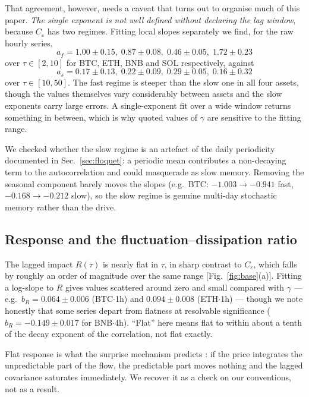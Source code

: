 \documentclass[aps,pre,twocolumn,superscriptaddress,floatfix,nofootinbib]{revtex4-2}
\newcommand{\eps}{\varepsilon}
\begin{document}
That agreement, however, needs a caveat that turns out to organise much of this
paper. \emph{The single exponent is not well defined without declaring the lag
window}, because $C_\eps$ has two regimes. Fitting local slopes separately we
find, for the raw hourly series,
\begin{equation}
  a_f = 1.00\pm0.15,\; 0.87\pm0.08,\; 0.46\pm0.05,\; 1.72\pm0.23
\end{equation}
over $\tau\in[2,10]$ for BTC, ETH, BNB and SOL respectively, against
\begin{equation}
  a_s = 0.17\pm0.13,\; 0.22\pm0.09,\; 0.29\pm0.05,\; 0.16\pm0.32
\end{equation}
over $\tau\in[10,50]$. The fast regime is steeper than the slow one in all four
assets, though the values themselves vary considerably between assets and the
slow exponents carry large errors. A single-exponent fit over a wide window
returns something in between, which is why quoted values of $\gamma$ are
sensitive to the fitting range.

We checked whether the slow regime is an artefact of the daily periodicity
documented in Sec.~\ref{sec:floquet}: a periodic mean contributes a
non-decaying term to the autocorrelation and could masquerade as slow memory.
Removing the seasonal component barely moves the slopes (e.g.\ BTC:
$-1.003\to-0.941$ fast, $-0.168\to-0.212$ slow), so the slow regime is genuine
multi-day stochastic memory rather than the drive.

\subsection{Response and the fluctuation--dissipation ratio}
\label{sec:response}

The lagged impact $R(\tau)$ is nearly flat in $\tau$, in sharp contrast to
$C_\eps$, which falls by roughly an order of magnitude over the same range
[Fig.~\ref{fig:base}(a)]. Fitting a log-slope to $R$ gives values scattered
around zero and small compared with $\gamma$ --- e.g.\ $b_R = 0.064\pm0.006$
(BTC$\cdot$1h) and $0.094\pm0.008$ (ETH$\cdot$1h) --- though we note honestly
that some series depart from flatness at resolvable significance
($b_R = -0.149\pm0.017$ for BNB$\cdot$4h). ``Flat'' here means flat to within
about a tenth of the decay exponent of the correlation, not flat exactly.

Flat response is what the surprise mechanism predicts
\cite{gerig2008,jaisson2014,muhlekarbe2026}: if the price integrates the
unpredictable part of the flow, the predictable part moves nothing and the
lagged covariance saturates immediately. We recover it as a check on our
conventions, not as a result.
\end{document}
